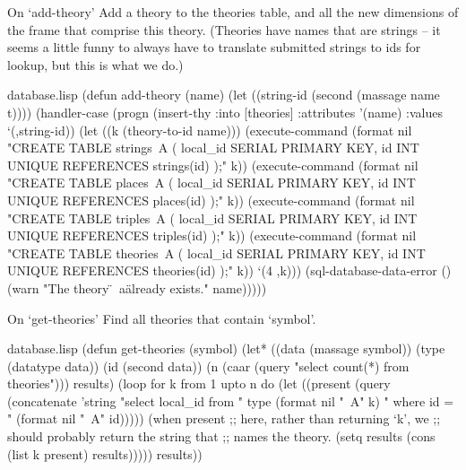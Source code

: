 \begin{notate}{On `add-theory'} \label{add-theory}
Add a theory to the theories table, and all the new
dimensions of the frame that comprise this theory.
(Theories have names that are strings -- it seems a
little funny to always have to translate submitted
strings to ids for lookup, but this is what we do.)
\end{notate}

\begin{common}{database.lisp}
(defun add-theory (name)
  (let ((string-id (second
                    (massage name t))))
    (handler-case
        (progn (insert-thy :into [theories]
                           :attributes '(name)
                           :values `(,string-id))
               (let ((k (theory-to-id name)))
                 (execute-command
                  (format nil "CREATE TABLE strings~A (
  local_id SERIAL PRIMARY KEY,
  id INT UNIQUE REFERENCES strings(id)
);" k))
                 (execute-command
                  (format nil "CREATE TABLE places~A (
  local_id SERIAL PRIMARY KEY,
  id INT UNIQUE REFERENCES places(id)
);" k))
                 (execute-command
                  (format nil "CREATE TABLE triples~A (
  local_id SERIAL PRIMARY KEY,
  id INT UNIQUE REFERENCES triples(id)
);" k))
                 (execute-command
                  (format nil "CREATE TABLE theories~A (
  local_id SERIAL PRIMARY KEY,
  id INT UNIQUE REFERENCES theories(id)
);" k))
                 `(4 ,k)))
      (sql-database-data-error
          ()
        (warn "The theory \"~a\" already exists."
              name)))))
\end{common}

\begin{notate}{On `get-theories'}
Find all theories that contain `symbol'.
\end{notate}

\begin{common}{database.lisp}
(defun get-theories (symbol)
  (let* ((data (massage symbol))
         (type (datatype data))
         (id (second data))
         (n (caar
             (query "select count(*) from theories")))
         results)
    (loop for k from 1 upto n
          do (let ((present
                    (query (concatenate
                            'string
                            "select local_id from "
                            type
                            (format nil "~A" k)
                            " where id = "
                            (format nil "~A" id)))))
               (when present
                 ;; here, rather than returning `k', we
                 ;; should probably return the string that
                 ;; names the theory.
                 (setq results (cons (list k present)
                                     results)))))
    results))
\end{common}

